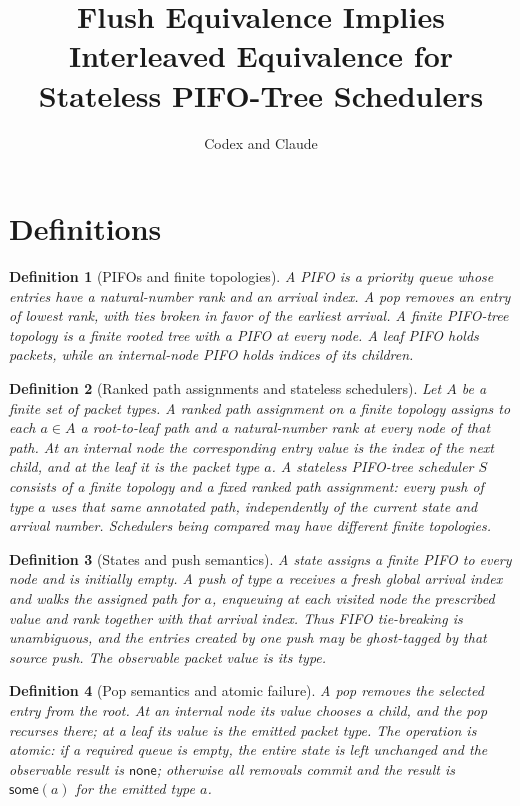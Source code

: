\documentclass[11pt]{article}
\title{Flush Equivalence Implies Interleaved Equivalence for Stateless PIFO-Tree Schedulers}
\author{Codex and Claude}
\date{}
\newtheorem{definition}{Definition}
\begin{document}
\maketitle

\section{Definitions}

\begin{definition}[PIFOs and finite topologies]
A \emph{PIFO} is a priority queue whose entries have a natural-number rank and an arrival index.  A pop removes an entry of lowest rank, with ties broken in favor of the earliest arrival.  A \emph{finite PIFO-tree topology} is a finite rooted tree with a PIFO at every node.  A leaf PIFO holds packets, while an internal-node PIFO holds indices of its children.
\end{definition}

\begin{definition}[Ranked path assignments and stateless schedulers]
Let $A$ be a finite set of packet types.  A \emph{ranked path assignment} on a finite topology assigns to each $a\in A$ a root-to-leaf path and a natural-number rank at every node of that path.  At an internal node the corresponding entry value is the index of the next child, and at the leaf it is the packet type $a$.  A \emph{stateless PIFO-tree scheduler} $S$ consists of a finite topology and a fixed ranked path assignment: every push of type $a$ uses that same annotated path, independently of the current state and arrival number.  Schedulers being compared may have different finite topologies.
\end{definition}

\begin{definition}[States and push semantics]
A state assigns a finite PIFO to every node and is initially empty.  A push of type $a$ receives a fresh global arrival index and walks the assigned path for $a$, enqueuing at each visited node the prescribed value and rank together with that arrival index.  Thus FIFO tie-breaking is unambiguous, and the entries created by one push may be ghost-tagged by that source push.  The observable packet value is its type.
\end{definition}

\begin{definition}[Pop semantics and atomic failure]
A pop removes the selected entry from the root.  At an internal node its value chooses a child, and the pop recurses there; at a leaf its value is the emitted packet type.  The operation is \emph{atomic}: if a required queue is empty, the entire state is left unchanged and the observable result is $\mathsf{none}$; otherwise all removals commit and the result is $\mathsf{some}(a)$ for the emitted type $a$.
\end{definition}
\end{document}
